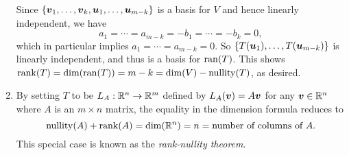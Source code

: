 \begin{enumerate}
\begin{pf}
Since \(\{\vb*{v}_1,\dotsc,\vb*{v}_k,\vb*{u}_1,\dotsc,\vb*{u}_{m-k}\}\) is
a basis for \(V\) and hence linearly independent, we have
\[
a_1=\dotsb=a_{m-k}=-b_1=\dotsb=-b_k=0,
\]
which in particular implies \(a_1=\dotsb=a_{m-k}=0\). So
\(\{T(\vb*{u}_1),\dotsc,T(\vb*{u}_{m-k})\}\) is linearly independent, and
thus is a basis for \(\operatorname{ran}(T)\). This shows
\(\operatorname{rank}(T)=\dim(\operatorname{ran}(T))=m-k=\dim(V)-\operatorname{nullity}(T)\), as desired.
\end{pf}

\item \label{it:rank-nullity-thm} By setting \(T\) to be \(L_A:\mathbb{R}^n\to\mathbb{R}^m\)
defined by \(L_A(\vb*{v})=A\vb*{v}\) for any \(\vb*{v}\in\mathbb{R}^n\) where \(A\)
is an \(m\times n\) matrix, the equality in the dimension formula reduces to
\[
\operatorname{nullity}(A)+\operatorname{rank}(A)=\dim(\mathbb{R}^n)=n=\text{number of columns of \(A\)}.
\]
This special case is known as the \emph{rank-nullity theorem}.
\end{enumerate}
